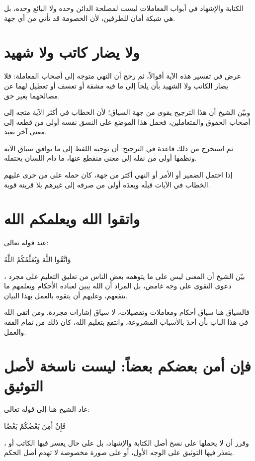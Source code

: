 \begin{fawaid}
الكتابة والإشهاد في أبواب المعاملات ليست لمصلحة الدائن وحده ولا البائع وحده، بل هي شبكة أمان للطرفين، لأن الخصومة قد تأتي من أي جهة.
\end{fawaid}

\section{ولا يضار كاتب ولا شهيد}
عرض  في تفسير هذه الآية أقوالاً، ثم رجح أن النهي متوجه إلى أصحاب المعاملة: فلا يضار الكاتب ولا الشهيد بأن يلجآ إلى ما فيه مشقة أو تعسف أو تعطيل لهما عن مصالحهما بغير حق.

وبيّن الشيخ أن هذا الترجيح يقوى من جهة السياق؛ لأن الخطاب في أكثر الآية متجه إلى أصحاب الحقوق والمتعاملين، فحمل هذا الموضع على النسق نفسه أولى من قطعه إلى معنى آخر بعيد.

ثم استخرج من ذلك قاعدة في الترجيح: أن توجيه اللفظ إلى ما يوافق سياق الآية ونظمها أولى من نقله إلى معنى منقطع عنها، ما دام اللسان يحتمله.

\begin{fawaid}
إذا احتمل الضمير أو الأمر أو النهي أكثر من جهة، كان حمله على من جرى عليهم الخطاب في الآيات قبلَه وبعدَه أولى من صرفه إلى غيرهم بلا قرينة قوية.
\end{fawaid}

\section{واتقوا الله ويعلمكم الله}
عند قوله تعالى: \begin{ayah}وَاتَّقُوا اللَّهَ وَيُعَلِّمُكُمُ اللَّهُ\end{ayah}، بيّن الشيخ أن المعنى ليس على ما يتوهمه بعض الناس من تعليق التعليم على مجرد دعوى التقوى على وجه غامض، بل المراد أن الله يبين لعباده الأحكام ويعلمهم ما ينفعهم، وعليهم أن يتقوه بالعمل بهذا البيان.

فالسياق هنا سياق أحكام ومعاملات وتفصيلات، لا سياق إشارات مجردة. ومن اتقى الله في هذا الباب بأن أخذ بالأسباب المشروعة، وانتفع بتعليم الله، كان ذلك من تمام الفقه والعمل.

\section{فإن أمن بعضكم بعضاً: ليست ناسخة لأصل التوثيق}
عاد الشيخ هنا إلى قوله تعالى: \begin{ayah}فَإِنْ أَمِنَ بَعْضُكُمْ بَعْضًا\end{ayah}، وقرر أن  لا يحملها على نسخ أصل الكتابة والإشهاد، بل على حال يعسر فيها الكاتب أو يتعذر فيها التوثيق على الوجه الأول، أو على صورة مخصوصة لا تهدم أصل الحكم.

